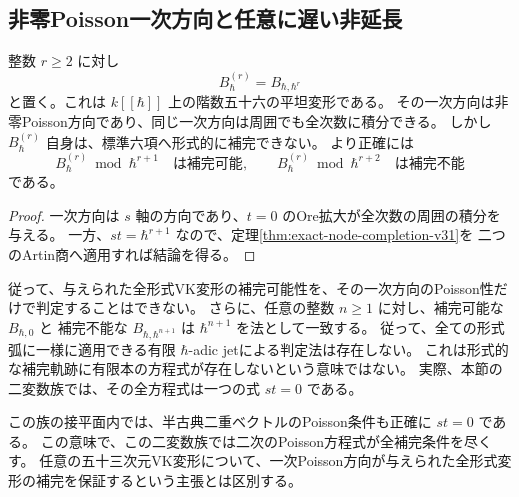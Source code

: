 \subsection{非零Poisson一次方向と任意に遅い非延長}

\begin{corollary}[任意に高い次数で最初に現れる補完障害]
\label{cor:arbitrarily-delayed-completion-v31}
整数 $r\ge2$ に対し
\[
 B^{(r)}_\hbar=B_{\hbar,\hbar^r}
\]
と置く。これは $k[[\hbar]]$ 上の階数五十六の平坦変形である。
その一次方向は非零Poisson方向であり、同じ一次方向は周囲でも全次数に積分できる。
しかし $B^{(r)}_\hbar$ 自身は、標準六項へ形式的に補完できない。
より正確には
\[
 B^{(r)}_\hbar\bmod\hbar^{r+1}
 \quad\text{は補完可能},\qquad
 B^{(r)}_\hbar\bmod\hbar^{r+2}
 \quad\text{は補完不能}
\]
である。
\end{corollary}

\begin{proof}
一次方向は $s$ 軸の方向であり、$t=0$ のOre拡大が全次数の周囲の積分を与える。
一方、$st=\hbar^{r+1}$ なので、定理\ref{thm:exact-node-completion-v31}を
二つのArtin商へ適用すれば結論を得る。
\end{proof}

従って、与えられた全形式VK変形の補完可能性を、その一次方向のPoisson性だけで判定することはできない。
さらに、任意の整数 $n\ge1$ に対し、補完可能な $B_{\hbar,0}$ と
補完不能な $B_{\hbar,\hbar^{n+1}}$ は $\hbar^{n+1}$ を法として一致する。
従って、全ての形式弧に一様に適用できる有限 $\hbar$-adic jetによる判定法は存在しない。
これは形式的な補完軌跡に有限本の方程式が存在しないという意味ではない。
実際、本節の二変数族では、その全方程式は一つの式 $st=0$ である。

この族の接平面内では、半古典二重ベクトルのPoisson条件も正確に $st=0$ である。
この意味で、この二変数族では二次のPoisson方程式が全補完条件を尽くす。
任意の五十三次元VK変形について、一次Poisson方向が与えられた全形式変形の補完を保証するという主張とは区別する。
